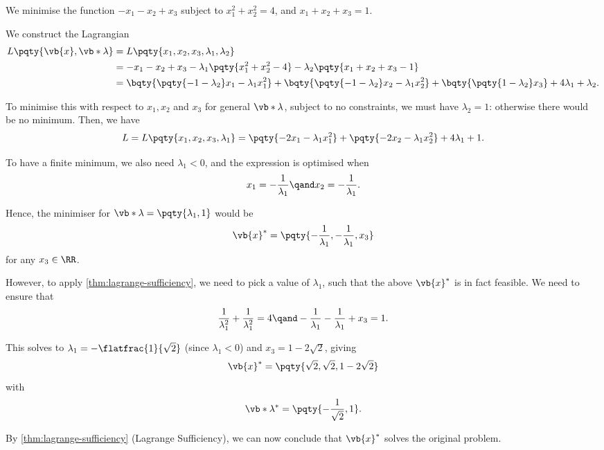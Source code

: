 \begin{example}
    We minimise the function \(- x_1 - x_2 + x_3\) subject to \(x_1^2 + x_2^2 = 4\), and \(x_1 + x_2 + x_3 = 1\).

    We construct the Lagrangian
    \begin{align*}
        L \pqty{\vb{x}, \vb*{\lambda}} &= L\pqty{x_1, x_2, x_3, \lambda_1, \lambda_2} \\
        &= - x_1 - x_2 + x_3 - \lambda_1 \pqty{x_1^2 + x_2^2 - 4} - \lambda_2 \pqty{x_1 + x_2 + x_3 - 1} \\
        &= \bqty{\pqty{-1 - \lambda_2} x_1 - \lambda_1 x_1^2} + \bqty{\pqty{-1 - \lambda_2} x_2 - \lambda_1 x_2^2} + \bqty{\pqty{1 - \lambda_2} x_3} + 4 \lambda_1 + \lambda_2.
    \end{align*}

    To minimise this with respect to \(x_1, x_2\) and \(x_3\) for general \(\vb*{\lambda}\), subject to no constraints, we must have \(\lambda_2 = 1\): otherwise there would be no minimum. Then, we have
    \[
        L = L\pqty{x_1, x_2, x_3, \lambda_1} = \pqty{-2 x_1 - \lambda_1 x_1^2} + \pqty{-2 x_2 - \lambda_1 x_2^2} + 4 \lambda_1 + 1.
    \]

    To have a finite minimum, we also need \(\lambda_1 < 0\), and the expression is optimised when
    \[
        x_1 = - \frac{1}{\lambda_1} \qand x_2 = - \frac{1}{\lambda_1}.
    \]

    Hence, the minimiser for \(\vb*{\lambda} = \pqty{\lambda_1, 1}\) would be
    \[
        \vb{x}^{\ast} = \pqty{- \frac{1}{\lambda_1}, - \frac{1}{\lambda_1}, x_3}
    \]
    for any \(x_3 \in \RR\).
    
    However, to apply \autoref{thm:lagrange-sufficiency}, we need to pick a value of \(\lambda_1\), such that the above \(\vb{x}^{\ast}\) is in fact feasible. We need to ensure that
    \[
        \frac{1}{\lambda_1^2} + \frac{1}{\lambda_1^2} = 4 \qand - \frac{1}{\lambda_1} - \frac{1}{\lambda_1} + x_3 = 1.
    \]

    This solves to \(\lambda_1 = - \flatfrac{1}{\sqrt{2}}\) (since \(\lambda_1 < 0\)) and \(x_3 = 1 - 2 \sqrt{2}\), giving
    \[
        \vb{x}^{\ast} = \pqty{\sqrt{2}, \sqrt{2}, 1 - 2 \sqrt{2}}
    \]
    with
    \[
        \vb*{\lambda}^{\ast} = \pqty{- \frac{1}{\sqrt{2}}, 1}.
    \]

    By \autoref{thm:lagrange-sufficiency} (Lagrange Sufficiency), we can now conclude that \(\vb{x}^{\ast}\) solves the original problem.
\end{example}

